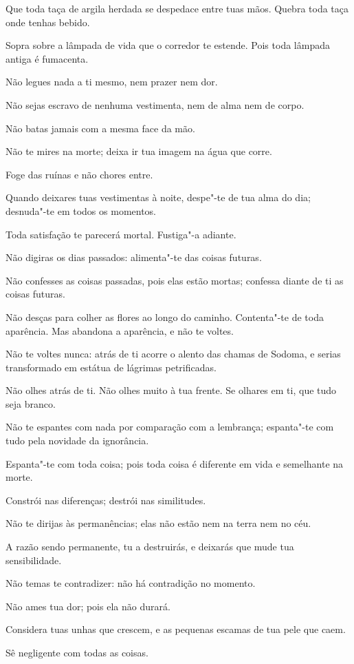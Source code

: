 Que toda taça de argila herdada se despedace entre tuas mãos. Quebra
toda taça onde tenhas bebido.

Sopra sobre a lâmpada de vida que o corredor te estende. Pois toda
lâmpada antiga é fumacenta.

Não legues nada a ti mesmo, nem prazer nem dor.

Não sejas escravo de nenhuma vestimenta, nem de alma nem de corpo.

Não batas jamais com a mesma face da mão.

Não te mires na morte; deixa ir tua imagem na água que corre.

Foge das ruínas e não chores entre.

Quando deixares tuas vestimentas à noite, despe"-te de tua alma do dia;
desnuda"-te em todos os momentos.

Toda satisfação te parecerá mortal. Fustiga"-a adiante.

Não digiras os dias passados: alimenta"-te das coisas futuras.

Não confesses as coisas passadas, pois elas estão mortas; confessa
diante de ti as coisas futuras.

Não desças para colher as flores ao longo do caminho. Contenta"-te de
toda aparência. Mas abandona a aparência, e não te voltes.

Não te voltes nunca: atrás de ti acorre o alento das chamas de Sodoma,
e serias transformado em estátua de lágrimas petrificadas.

Não olhes atrás de ti. Não olhes muito à tua frente. Se olhares em ti,
que tudo seja branco.

Não te espantes com nada por comparação com a lembrança; espanta"-te com
tudo pela novidade da ignorância.

Espanta"-te com toda coisa; pois toda coisa é diferente em vida e
semelhante na morte.

Constrói nas diferenças; destrói nas similitudes.

Não te dirijas às permanências; elas não estão nem na terra nem no céu.

A razão sendo permanente, tu a destruirás, e deixarás que mude tua
sensibilidade.

Não temas te contradizer: não há contradição no momento.

Não ames tua dor; pois ela não durará.

Considera tuas unhas que crescem, e as pequenas escamas de tua pele que
caem.

Sê negligente com todas as coisas.

